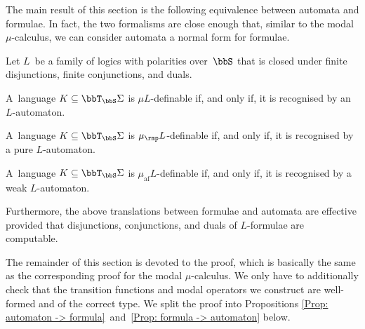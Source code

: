 \documentclass[10pt, fleqn]{scrartcl}
\newcommand*{\muaf}{\mu_{\mathrm{af}}}
\newcommand*{\mup}{\mu_\rmp}
\newcommand*{\?}{\kern .08em}
\begin{document}
The main result of this section is the following equivalence between automata and
formulae. In fact, the two formalisms are close enough that, similar to the
modal $\mu$-calculus, we can consider automata a normal form for formulae.
\begin{Thm}\label{Thm: equivalent automata and fixed-point formulae}
Let $L$~be a family of logics with polarities over\/~$\bbS$ that is closed under
finite disjunctions, finite conjunctions, and duals.
\begin{enuma}
\item A~language $K \subseteq \bbT_\bbS\Sigma$ is $\mu L$-definable if, and only if,
  it is recognised by an $L$-automaton.
\item A~language $K \subseteq \bbT_\bbS\Sigma$ is $\mup L$-definable if, and only if,
  it is recognised by a pure $L$-automaton.
\item A~language $K \subseteq \bbT_\bbS\Sigma$ is $\muaf L$-definable if, and only if,
  it is recognised by a weak $L$-automaton.
\end{enuma}
Furthermore, the above translations between formulae and automata are effective
provided that disjunctions, conjunctions, and duals of $L$-formulae are computable.
\end{Thm}
The remainder of this section is devoted to the proof, which is basically the same
as the corresponding proof for the modal $\mu$-calculus. We only have to additionally check
that the transition functions and modal operators we construct are well-formed and
of the correct type. We split the proof into
Propositions \ref{Prop: automaton -> formula}~and~\ref{Prop: formula -> automaton} below.
\end{document}
